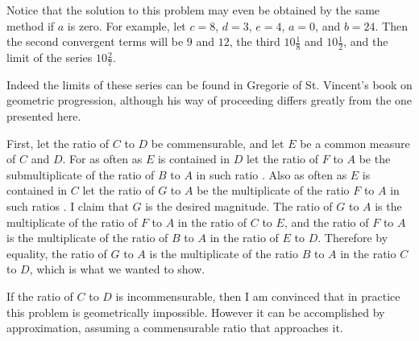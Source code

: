 \documentclass[11pt,letterpaper]{book}
\begin{document}
Notice that the solution to this problem may even be obtained by the same
method if $a$ is zero. For example, let $c = 8$, $d = 3$, $e
= 4$, $a = 0$, and $b = 24$. Then the second convergent terms will be $9$ and
$12$, the third $10\frac{1}{8}$ and $10\frac{1}{2}$, and the limit of the series
$10\frac{2}{7}$.

Indeed the limits of these series can be found in Gregorie of St. Vincent's book
on geometric progression, although his way of proceeding differs greatly from
the one presented here.

\newpage
{}

First, let the ratio of $C$ to $D$ be commensurable, and let $E$ be a common
measure of $C$ and $D$. For as often as $E$ is contained in $D$ let the ratio of
$F$ to $A$ be the submultiplicate of the ratio of $B$ to $A$ in such
ratio
. Also as often as $E$ is contained in
$C$ let the ratio of $G$ to $A$ be the multiplicate of the ratio $F$ to $A$ in
such ratios
.
I claim that $G$ is the desired magnitude. The ratio of $G$ to $A$ is the
multiplicate of the ratio of $F$ to $A$ in the ratio of $C$ to $E$, and the
ratio of $F$ to $A$ is the multiplicate of the ratio of $B$ to $A$ in the ratio
of $E$ to $D$.
Therefore by equality, the ratio of $G$ to $A$ is the multiplicate of the ratio
$B$ to $A$ in the ratio $C$ to $D$, which is what we wanted to show.

If the ratio of $C$ to $D$ is incommensurable, then I am convinced that in
practice this problem is geometrically impossible. However it can be
accomplished by approximation, assuming a commensurable ratio that approaches
it.
\end{document}
